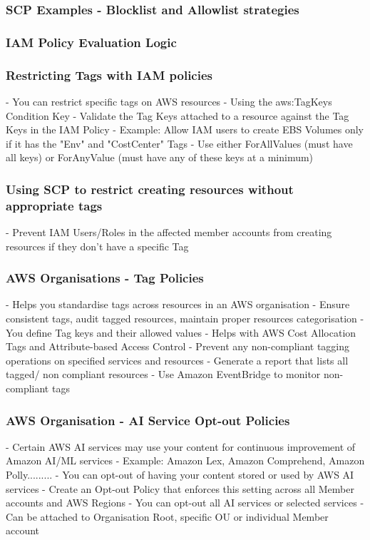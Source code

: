 \documentclass[11pt]{book}
\begin{document}
    \subsubsection{SCP Examples - Blocklist and Allowlist strategies}

    \subsubsection{IAM Policy Evaluation Logic}

    \subsubsection{Restricting Tags with IAM policies}
    - You can restrict specific tags on AWS resources
    - Using the aws:TagKeys Condition Key
    - Validate the Tag Keys attached to a resource against the Tag Keys in the IAM Policy
    - Example: Allow IAM users to create EBS Volumes only if it has the "Env" and "CostCenter" Tags
    - Use either ForAllValues (must have all keys) or ForAnyValue (must have any of these keys at a minimum)


    \subsubsection{Using SCP to restrict creating resources without appropriate tags}
    - Prevent IAM Users/Roles in the affected member accounts from creating resources if they don't have a specific Tag

    \subsubsection{AWS Organisations - Tag Policies}
    - Helps you standardise tags across resources in an AWS organisation
    - Ensure consistent tags, audit tagged resources, maintain proper resources categorisation
    - You define Tag keys and their allowed values
    - Helps with AWS Cost Allocation Tags and Attribute-based Access Control
    - Prevent any non-compliant tagging operations on specified services and resources
    - Generate a report that lists all tagged/ non compliant resources
    - Use Amazon EventBridge to monitor non-compliant tags

    \subsubsection{AWS Organisation - AI Service Opt-out Policies}
    - Certain AWS AI services may use your content for continuous improvement of Amazon AI/ML services
    - Example: Amazon Lex, Amazon Comprehend, Amazon Polly.........
    - You can opt-out of having your content stored or used by AWS AI services
    - Create an Opt-out Policy that enforces this setting across all Member accounts and AWS Regions
    - You can opt-out all AI services or selected services
    - Can be attached to Organisation Root, specific OU or individual Member account
\end{document}
